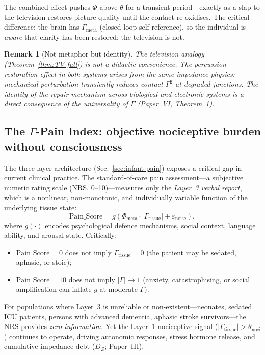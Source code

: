\documentclass[aps,pre,twocolumn,superscriptaddress,floatfix]{revtex4-2}
\newtheorem{remark}{Remark}
\begin{document}
The combined effect pushes $\Phi$ above $\theta$ for
a transient period---exactly as a slap to the television
restores picture quality until the contact re-oxidises.
The critical difference: the brain has $\Gamma_{\text{meta}}$
(closed-loop self-reference), so the individual is
\emph{aware} that clarity has been restored;
the television is not.

\begin{remark}[Not metaphor but identity]
The television analogy (Theorem~\ref{thm:TV-full}) is not
a didactic convenience.
The percussion-restoration effect in both systems arises
from the same impedance physics: mechanical perturbation
transiently reduces contact $\Gamma^2$ at degraded
junctions.
The identity of the repair mechanism across biological
and electronic systems is a direct consequence of the
universality of $\Gamma$ (Paper~VI, Theorem~1).
\end{remark}

\subsection{The $\Gamma$-Pain Index: objective nociceptive
  burden without consciousness}
\label{sec:gamma-pain-index}

The three-layer architecture (Sec.~\ref{sec:infant-pain})
exposes a critical gap in current clinical practice.
The standard-of-care pain assessment---a subjective
numeric rating scale (NRS, 0--10)---measures only the
\emph{Layer~3 verbal report}, which is a nonlinear,
non-monotonic, and individually variable function of the
underlying tissue state:
\begin{equation}
  \text{Pain\_Score} =
    g\!\left(
      \Phi_{\text{meta}}\cdot|\Gamma_{\text{tissue}}|
      + \varepsilon_{\text{noise}}
    \right),
  \label{eq:pain-score-function}
\end{equation}
where $g(\cdot)$ encodes psychological defence mechanisms,
social context, language ability, and arousal state.
Critically:
\begin{itemize}
  \item $\text{Pain\_Score}=0$ does not imply
    $\Gamma_{\text{tissue}}=0$
    (the patient may be sedated, aphasic, or stoic);
  \item $\text{Pain\_Score}=10$ does not imply
    $|\Gamma|\to 1$
    (anxiety, catastrophising, or social amplification
    can inflate $g$ at moderate $\Gamma$).
\end{itemize}

For populations where Layer~3 is unreliable or
non-existent---neonates, sedated ICU patients, persons
with advanced dementia, aphasic stroke survivors---the
NRS provides \emph{zero information}.
Yet the Layer~1 nociceptive signal
($|\Gamma_{\text{tissue}}|>\theta_{\text{noci}}$)
continues to operate, driving autonomic responses,
stress hormone release, and cumulative impedance debt
($D_Z$; Paper~III).
\end{document}
